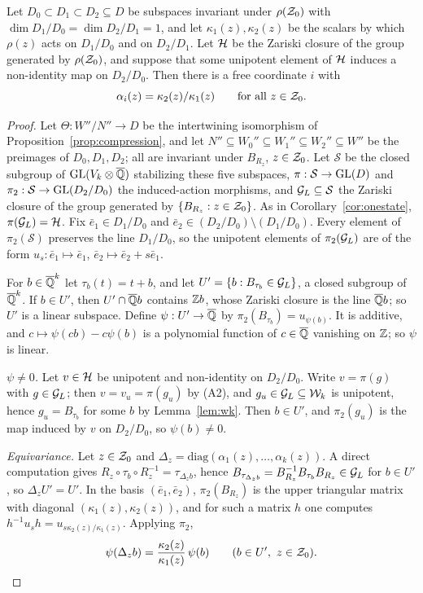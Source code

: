 \begin{proposition}\label{prop:invweight}
Let $D_0\subset D_1\subset D_2\subseteq D$ be subspaces invariant under $\rho(\mathcal{Z}_0)$ with $\dim D_1/D_0=\dim D_2/D_1=1$, and let $\kappa_1(z),\kappa_2(z)$ be the scalars by which $\rho(z)$ acts on $D_1/D_0$ and on $D_2/D_1$. Let $\mathcal{H}$ be the Zariski closure of the group generated by $\rho(\mathcal{Z}_0)$, and suppose that some unipotent element of $\mathcal{H}$ induces a non-identity map on $D_2/D_0$. Then there is a free coordinate $i$ with
\[
\alpha_i(z)=\kappa_2(z)/\kappa_1(z)\qquad\text{for all }z\in\mathcal{Z}_0 .
\]
\end{proposition}
\begin{proof}
Let $\Theta:W''/N''\to D$ be the intertwining isomorphism of Proposition~\ref{prop:compression}, and let $N''\subseteq W_0''\subseteq W_1''\subseteq W_2''\subseteq W''$ be the preimages of $D_0,D_1,D_2$; all are invariant under $B_{R_z}$, $z\in\mathcal{Z}_0$. Let $\mathcal S$ be the closed subgroup of $\mathrm{GL}(V_k\otimes\overline{\mathbb{Q}})$ stabilizing these five subspaces, $\pi:\mathcal S\to\mathrm{GL}(D)$ and $\pi_2:\mathcal S\to\mathrm{GL}(D_2/D_0)$ the induced-action morphisms, and $\mathcal{G}_L\subseteq\mathcal S$ the Zariski closure of the group generated by $\{B_{R_z}:z\in\mathcal{Z}_0\}$. As in Corollary~\ref{cor:onestate}, $\pi(\mathcal{G}_L)=\mathcal{H}$. Fix $\bar e_1\in D_1/D_0$ and $\bar e_2\in(D_2/D_0)\setminus(D_1/D_0)$. Every element of $\pi_2(\mathcal S)$ preserves the line $D_1/D_0$, so the unipotent elements of $\pi_2(\mathcal{G}_L)$ are of the form $u_s:\bar e_1\mapsto\bar e_1$, $\bar e_2\mapsto\bar e_2+s\bar e_1$.

For $b\in\overline{\mathbb{Q}}^k$ let $\tau_b(t)=t+b$, and let $U'=\{b:B_{\tau_b}\in\mathcal{G}_L\}$, a closed subgroup of $\overline{\mathbb{Q}}^k$. If $b\in U'$, then $U'\cap\overline{\mathbb{Q}} b$ contains $\mathbb{Z} b$, whose Zariski closure is the line $\overline{\mathbb{Q}} b$; so $U'$ is a linear subspace. Define $\psi:U'\to\overline{\mathbb{Q}}$ by $\pi_2(B_{\tau_b})=u_{\psi(b)}$. It is additive, and $c\mapsto\psi(cb)-c\psi(b)$ is a polynomial function of $c\in\overline{\mathbb{Q}}$ vanishing on $\mathbb{Z}$; so $\psi$ is linear.

\emph{$\psi\ne0$.} Let $v\in\mathcal{H}$ be unipotent and non-identity on $D_2/D_0$. Write $v=\pi(g)$ with $g\in\mathcal{G}_L$; then $v=v_u=\pi(g_u)$ by (A2), and $g_u\in\mathcal{G}_L\subseteq\mathcal{W}_k$ is unipotent, hence $g_u=B_{\tau_b}$ for some $b$ by Lemma~\ref{lem:wk}. Then $b\in U'$, and $\pi_2(g_u)$ is the map induced by $v$ on $D_2/D_0$, so $\psi(b)\ne0$.

\emph{Equivariance.} Let $z\in\mathcal{Z}_0$ and $\Delta_z=\mathrm{diag}(\alpha_1(z),\ldots,\alpha_k(z))$. A direct computation gives $R_z\circ\tau_b\circ R_z^{-1}=\tau_{\Delta_zb}$, hence $B_{\tau_{\Delta_zb}}=B_{R_z}^{-1}B_{\tau_b}B_{R_z}\in\mathcal{G}_L$ for $b\in U'$, so $\Delta_zU'=U'$. In the basis $(\bar e_1,\bar e_2)$, $\pi_2(B_{R_z})$ is the upper triangular matrix with diagonal $(\kappa_1(z),\kappa_2(z))$, and for such a matrix $h$ one computes $h^{-1}u_sh=u_{s\kappa_2(z)/\kappa_1(z)}$. Applying $\pi_2$,
\[
\psi(\Delta_zb)=\frac{\kappa_2(z)}{\kappa_1(z)}\,\psi(b)\qquad(b\in U',\ z\in\mathcal{Z}_0).
\]


\end{proof}
